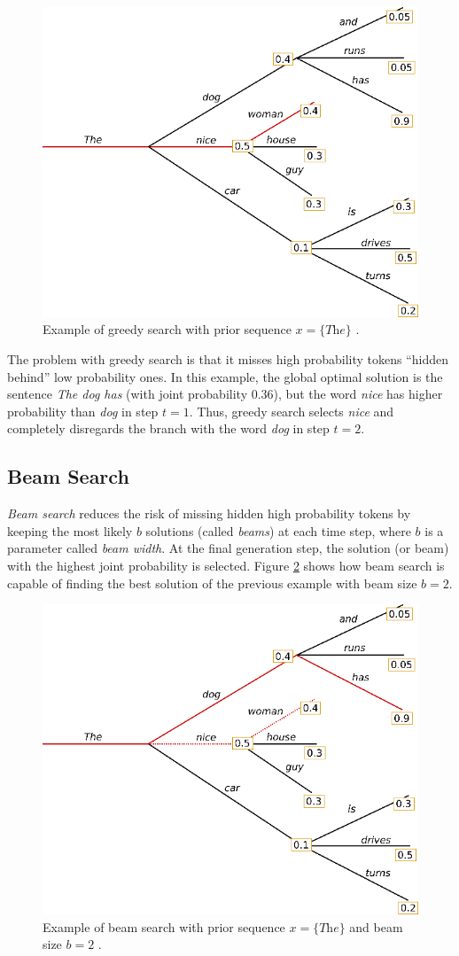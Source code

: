 \begin{figure}[!h]
 \centering
 \includegraphics[width=0.7\columnwidth]{imgs/background/greedy.png}
 \caption{Example of greedy search with prior sequence $x = \{\textit{The}\}$ \cite{platen2020}.}
 \label{fig:greedy}
\end{figure}

The problem with greedy search is that it misses high probability tokens ``hidden behind'' low probability ones. In this example, the global optimal solution is the sentence \textit{The dog has} (with joint probability $0.36$), but the word \textit{nice} has higher probability than \textit{dog} in step $t=1$. Thus, greedy search selects \textit{nice} and completely disregards the branch with the word \textit{dog} in step $t=2$.

\subsection{Beam Search}

\textit{Beam search} reduces the risk of missing hidden high probability tokens by keeping the most likely $b$ solutions (called \textit{beams}) at each time step, where $b$ is a parameter called \textit{beam width}. At the final generation step, the solution (or beam) with the highest joint probability is selected. Figure \ref{fig:beam} shows how beam search is capable of finding the best solution of the previous example with beam size $b=2$.

\begin{figure}[!h]
 \centering
 \includegraphics[width=0.7\columnwidth]{imgs/background/beam.png}
 \caption{Example of beam search with prior sequence $x = \{\textit{The}\}$ and
 beam size $b=2$ \cite{platen2020}.}
 \label{fig:beam}
\end{figure}

